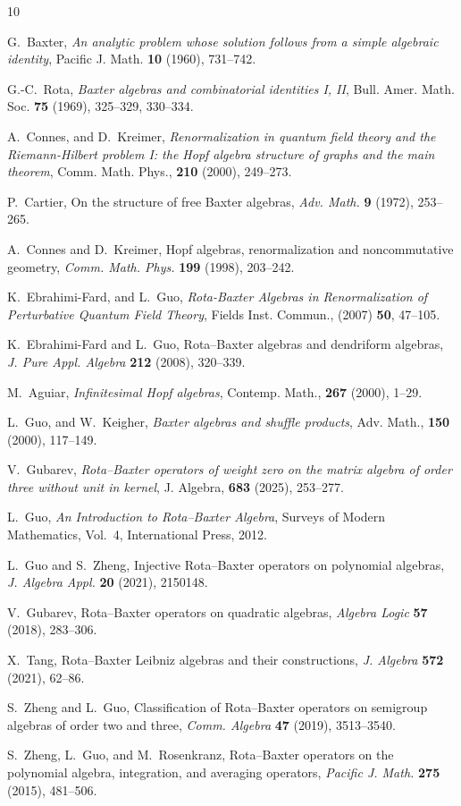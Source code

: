 \documentclass[a4paper,11pt]{elsarticle}
\theoremstyle{definition}
\theoremstyle{remark}
\begin{document}
\begin{thebibliography}{10}

G.~Baxter,
\emph{An analytic problem whose solution follows from a simple algebraic identity},
Pacific J. Math. \textbf{10} (1960), 731--742.

G.-C.~Rota,
\emph{Baxter algebras and combinatorial identities I, II},
Bull. Amer. Math. Soc. \textbf{75} (1969), 325--329, 330--334.

A.~Connes, and D.~Kreimer,
\emph{Renormalization in quantum field theory and the Riemann-Hilbert problem I: the Hopf algebra structure of graphs and the main theorem},
Comm. Math. Phys., \textbf{210} (2000), 249--273.

P.~Cartier,
On the structure of free Baxter algebras,
\emph{Adv. Math.} \textbf{9} (1972), 253--265.

A.~Connes and D.~Kreimer,
Hopf algebras, renormalization and noncommutative geometry,
\emph{Comm. Math. Phys.} \textbf{199} (1998), 203--242.

K.~Ebrahimi-Fard, and L.~Guo,
\emph{Rota-Baxter Algebras in Renormalization of Perturbative Quantum Field Theory},
Fields Inst. Commun., (2007) \textbf{50}, 47--105.


K.~Ebrahimi-Fard and L.~Guo,
Rota--Baxter algebras and dendriform algebras,
\emph{J. Pure Appl. Algebra} \textbf{212} (2008), 320--339. 


M.~Aguiar,
\emph{Infinitesimal Hopf algebras},
Contemp. Math., \textbf{267} (2000), 1--29.


L.~Guo, and W.~Keigher,
\emph{Baxter algebras and shuffle products},
Adv. Math., \textbf{150} (2000), 117--149.

V.~Gubarev,
\emph{Rota--Baxter operators of weight zero on the matrix algebra of order three without unit in kernel},
J. Algebra,
\textbf{683} (2025),
253--277.


L.~Guo,
\emph{An Introduction to Rota--Baxter Algebra},
Surveys of Modern Mathematics, Vol.~4,
International Press, 2012.

L.~Guo and S.~Zheng,
Injective Rota--Baxter operators on polynomial algebras,
\emph{J. Algebra Appl.} \textbf{20} (2021), 2150148.

V.~Gubarev,
Rota--Baxter operators on quadratic algebras,
\emph{Algebra Logic} \textbf{57} (2018), 283--306.


X.~Tang,
Rota--Baxter Leibniz algebras and their constructions,
\emph{J. Algebra} \textbf{572} (2021), 62--86.

S.~Zheng and L.~Guo,
Classification of Rota--Baxter operators on semigroup algebras of order two and three,
\emph{Comm. Algebra} \textbf{47} (2019), 3513--3540.

S.~Zheng, L.~Guo, and M.~Rosenkranz,
Rota--Baxter operators on the polynomial algebra, integration, and averaging operators,
\emph{Pacific J. Math.} \textbf{275} (2015), 481--506.

\
\end{thebibliography}
\end{document}
